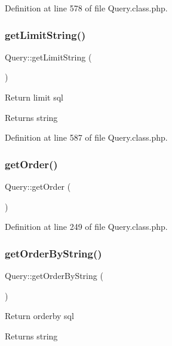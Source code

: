 Definition at line 578 of file Query.\+class.\+php.

\mbox{\label{classQuery_a693e75de6fb7cfbc07f73792ac800246}} 
\subsubsection{\texorpdfstring{get\+Limit\+String()}{getLimitString()}}
{\footnotesize\ttfamily Query\+::get\+Limit\+String (\begin{DoxyParamCaption}{ }\end{DoxyParamCaption})}

Return limit sql \begin{DoxyReturn}{Returns}
string 
\end{DoxyReturn}


Definition at line 587 of file Query.\+class.\+php.

\mbox{\label{classQuery_a41f8624567819ead73e5b57935e526c7}} 
\subsubsection{\texorpdfstring{get\+Order()}{getOrder()}}
{\footnotesize\ttfamily Query\+::get\+Order (\begin{DoxyParamCaption}{ }\end{DoxyParamCaption})}



Definition at line 249 of file Query.\+class.\+php.

\mbox{\label{classQuery_a43b8446cd8699978988b8ea0bc2642dd}} 
\subsubsection{\texorpdfstring{get\+Order\+By\+String()}{getOrderByString()}}
{\footnotesize\ttfamily Query\+::get\+Order\+By\+String (\begin{DoxyParamCaption}{ }\end{DoxyParamCaption})}

Return orderby sql \begin{DoxyReturn}{Returns}
string 
\end{DoxyReturn}


